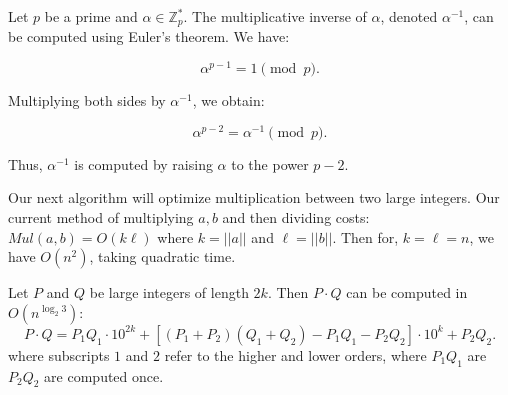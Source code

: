 \begin{theo}

    Let \( p \) be a prime and \( \alpha \in \mathbb{Z}_p^* \). The multiplicative inverse of \( \alpha \), denoted \( \alpha^{-1} \), can be computed using Euler's theorem. We have:

    \[
    \alpha^{p-1} = 1 \pmod{p}.
    \]
    
    \noindent
    Multiplying both sides by \( \alpha^{-1} \), we obtain:

    \[
    \alpha^{p-2} = \alpha^{-1} \pmod{p}.
    \]
    
    \noindent
    Thus, \( \alpha^{-1} \) is computed by raising \( \alpha \) to the power \( p-2 \).
\end{theo}

\noindent
Our next algorithm will optimize multiplication between two large integers. Our current method of multiplying $a,b$ and then dividing costs:
$Mul(a,b)=O(k\ell)$ where $k=||a||$ and $\ell=||b||$. Then for, $k=\ell=n$, we have $O(n^2)$, taking quadratic time. 

\newpage
\begin{theo}

    Let \( P \) and \( Q \) be large integers of length \( 2k \). Then \( P \cdot Q \) can be computed in \( O(n^{\log_2 3}) \):
    \[
    P \cdot Q = P_1 Q_1 \cdot 10^{2k} + \left[ (P_1 + P_2)(Q_1 + Q_2) - P_1 Q_1 - P_2 Q_2 \right] \cdot 10^k + P_2 Q_2.
    \]
    where subscripts \( 1 \) and \( 2 \) refer to the higher and lower orders, where $P_1 Q_1$ are $P_2 Q_2$ are computed once.
\end{theo}

